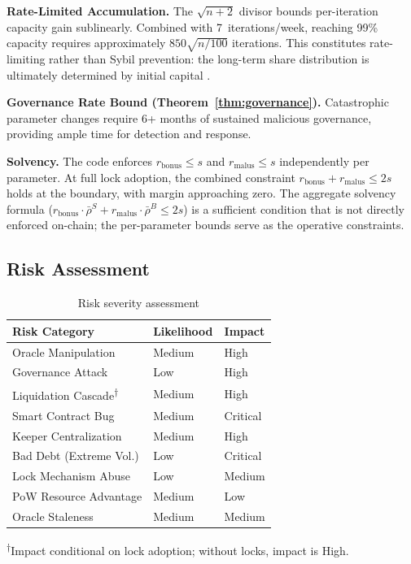 \documentclass[10pt,a4paper,twocolumn]{article}
\begin{document}
\textbf{Rate-Limited Accumulation.} The $\sqrt{n{+}2}$ divisor bounds per-iteration capacity gain sublinearly. Combined with 7~iterations/week, reaching 99\% capacity requires approximately $850\sqrt{n/100}$ iterations. This constitutes rate-limiting rather than Sybil prevention: the long-term share distribution is ultimately determined by initial capital \cite{sim}.

\textbf{Governance Rate Bound (Theorem~\ref{thm:governance}).} Catastrophic parameter changes require 6+ months of sustained malicious governance, providing ample time for detection and response.

\textbf{Solvency.} The code enforces $r_{\text{bonus}} \leq s$ and $r_{\text{malus}} \leq s$ independently per parameter. At full lock adoption, the combined constraint $r_{\text{bonus}} + r_{\text{malus}} \leq 2s$ holds at the boundary, with margin approaching zero. The aggregate solvency formula ($r_{\text{bonus}} \cdot \bar{\rho}^S + r_{\text{malus}} \cdot \bar{\rho}^B \leq 2s$) is a sufficient condition that is not directly enforced on-chain; the per-parameter bounds serve as the operative constraints.

\subsection{Risk Assessment}

\begin{table}[htbp]
\centering
\caption{Risk severity assessment}
\label{tab:risks}
\small
\begin{tabularx}{0.95\columnwidth}{@{}l >{\centering\arraybackslash}X >{\centering\arraybackslash}X@{}}
\toprule
Risk Category & Likelihood & Impact \\
\midrule
Oracle Manipulation & Medium & High \\
Governance Attack & Low & High \\
Liquidation Cascade\textsuperscript{$\dagger$} & Medium & High \\
Smart Contract Bug & Medium & Critical \\
Keeper Centralization & Medium & High \\
Bad Debt (Extreme Vol.) & Low & Critical \\
Lock Mechanism Abuse & Low & Medium \\
PoW Resource Advantage & Medium & Low \\
Oracle Staleness & Medium & Medium \\
\bottomrule
\end{tabularx}
\vspace{0.5em}
\par\raggedright\scriptsize\textsuperscript{$\dagger$}Impact conditional on lock adoption; without locks, impact is High.
\end{table}
\end{document}

